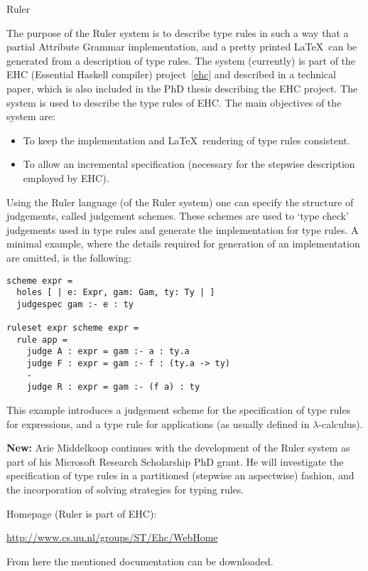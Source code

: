 \begin{hcarentry}{Ruler}
\label{ruler}
\makeheader

The purpose of the Ruler system is to describe type rules in such a way that a
partial Attribute Grammar implementation, and a pretty printed \LaTeX\ can be
generated from a description of type rules.  The system (currently) is part of
the EHC (Essential Haskell compiler) project~\cref{ehc} and described in a technical
paper, which is also included in the PhD thesis describing the EHC project.
The system is used to describe the type rules of EHC.  The main objectives of
the system are:
\begin{itemize}
\item To keep the implementation and \LaTeX\ rendering of type rules consistent.
\item To allow an incremental specification (necessary for the stepwise description employed by EHC).
\end{itemize}

Using the Ruler language (of the Ruler system) one can specify the structure
of judgements, called judgement schemes.  These schemes are used to `type
check' judgements used in type rules and generate the implementation for type
rules.  A minimal example, where the details required for generation of an
implementation are omitted, is the following:
\begin{verbatim}
scheme expr =
  holes [ | e: Expr, gam: Gam, ty: Ty | ]
  judgespec gam :- e : ty

ruleset expr scheme expr =
  rule app =
    judge A : expr = gam :- a : ty.a
    judge F : expr = gam :- f : (ty.a -> ty)
    -
    judge R : expr = gam :- (f a) : ty
\end{verbatim}
This example introduces a judgement scheme for the specification of type rules
for expressions, and a type rule for applications (as usually defined in
$\lambda$-calculus).

\textbf{New:}
Arie Middelkoop continues with the development of the Ruler system as part
of his Microsoft Research Scholarship PhD grant.
He will investigate the specification of type rules in a partitioned (stepwise an aspectwise)
fashion,
and the incorporation of solving strategies for typing rules.

\FurtherReading
\begin{compactitem}
\item Homepage (Ruler is part of EHC):

\url{http://www.cs.uu.nl/groups/ST/Ehc/WebHome}

From here the mentioned documentation can be downloaded.
\end{compactitem}
\end{hcarentry}
